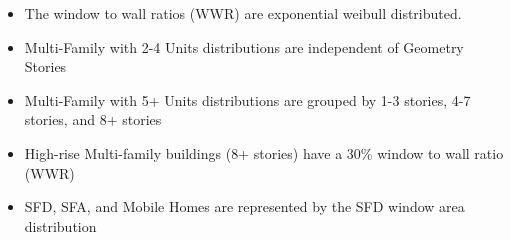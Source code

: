 \begin{itemize}
\item The window to wall ratios (WWR) are exponential weibull distributed.
\item Multi-Family with 2-4 Units distributions are independent of Geometry Stories
\item Multi-Family with 5+ Units distributions are grouped by 1-3 stories, 4-7 stories, and 8+ stories
\item High-rise Multi-family buildings (8+ stories) have a 30\% window to wall ratio (WWR)
\item SFD, SFA, and Mobile Homes are represented by the SFD window area distribution
\end{itemize}
